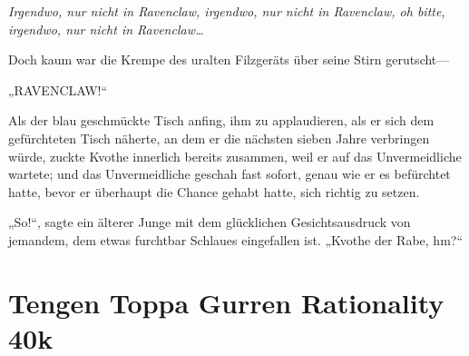 \emph{Irgendwo, nur nicht in Ravenclaw, irgendwo, nur nicht in Ravenclaw, oh bitte, irgendwo, nur nicht in Ravenclaw…}

Doch kaum war die Krempe des uralten Filzgeräts über seine Stirn gerutscht—

„RAVENCLAW!“

Als der blau geschmückte Tisch anfing, ihm zu applaudieren, als er sich dem gefürchteten Tisch näherte, an dem er die nächsten sieben Jahre verbringen würde, zuckte Kvothe innerlich bereits zusammen, weil er auf das Unvermeidliche wartete; und das Unvermeidliche geschah fast sofort, genau wie er es befürchtet hatte, bevor er überhaupt die Chance gehabt hatte, sich richtig zu setzen.

„So!“, sagte ein älterer Junge mit dem glücklichen Gesichtsausdruck von jemandem, dem etwas furchtbar Schlaues eingefallen ist.
„Kvothe der Rabe, hm?“

\section{Tengen Toppa Gurren Rationality 40k}

